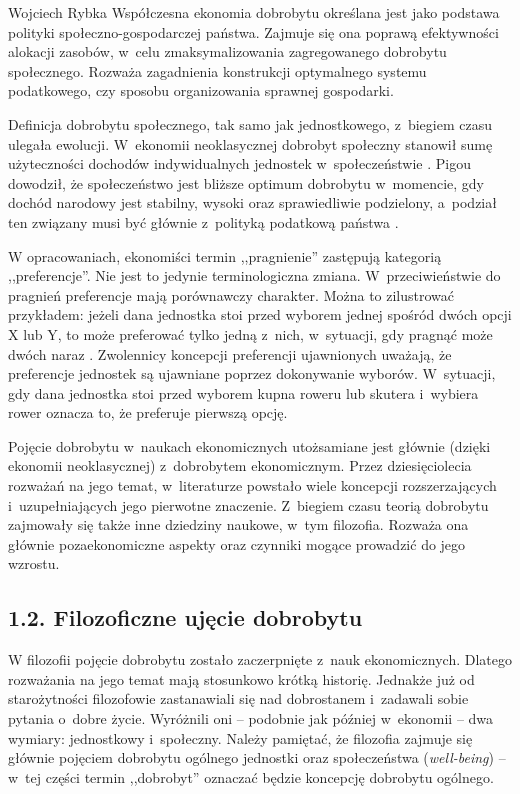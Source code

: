 \begin{artplenv}{Wojciech Rybka}
Współczesna ekonomia dobrobytu określana jest jako podstawa polityki społeczno-gospodarczej państwa. Zajmuje się ona
poprawą efektywności alokacji zasobów, w~celu zmaksymalizowania zagregowanego dobrobytu społecznego. Rozważa
zagadnienia konstrukcji optymalnego systemu podatkowego, czy sposobu organizowania sprawnej gospodarki.

Definicja dobrobytu społecznego, tak samo jak jednostkowego, z~biegiem czasu ulegała ewolucji. W~ekonomii neoklasycznej
dobrobyt społeczny stanowił sumę użyteczności dochodów indywidualnych jednostek w~społeczeństwie
\parencite{zaremba_dobrobyt_2016}.
Pigou dowodził, że społeczeństwo jest bliższe optimum
dobrobytu w~momencie, gdy dochód narodowy jest stabilny, wysoki oraz sprawiedliwie podzielony, a~podział ten związany musi być
głównie z~polityką podatkową państwa
\parencite{zaremba_dobrobyt_2016}.

W opracowaniach, ekonomiści termin ,,pragnienie'' zastępują kategorią ,,preferencje''. Nie jest to jedynie terminologiczna
zmiana. W~przeciwieństwie do pragnień preferencje mają porównawczy charakter. Można to zilustrować przykładem: jeżeli
dana jednostka stoi przed wyborem jednej spośród dwóch opcji X lub Y, to może preferować tylko jedną z~nich,
w~sytuacji, gdy pragnąć może dwóch naraz
\parencite{kwarcinski_koncepcje_2016}.
Zwolennicy koncepcji
preferencji ujawnionych uważają,
że preferencje jednostek są ujawniane poprzez dokonywanie wyborów. W~sytuacji, gdy dana jednostka
stoi przed wyborem kupna roweru lub skutera i~wybiera rower oznacza to, że preferuje pierwszą opcję. 

Pojęcie dobrobytu w~naukach ekonomicznych utożsamiane jest głównie (dzięki ekonomii neoklasycznej) z~dobrobytem
ekonomicznym. Przez dziesięciolecia rozważań na jego temat, w~literaturze powstało wiele koncepcji
rozszerzających i~uzupełniających jego pierwotne znaczenie. Z~biegiem czasu teorią dobrobytu
zajmowały się także inne dziedziny naukowe, w~tym filozofia. Rozważa ona głównie pozaekonomiczne
aspekty oraz czynniki mogące prowadzić do jego wzrostu. 

\subsection{1.2. Filozoficzne ujęcie dobrobytu}
W filozofii pojęcie dobrobytu zostało zaczerpnięte z~nauk ekonomicznych. Dlatego rozważania na jego temat mają
stosunkowo krótką historię. Jednakże już od starożytności filozofowie zastanawiali się nad dobrostanem i~zadawali sobie
pytania o~dobre życie. Wyróżnili oni -- podobnie jak później w~ekonomii -- dwa wymiary: jednostkowy i~społeczny. Należy
pamiętać, że filozofia zajmuje się głównie pojęciem dobrobytu ogólnego jednostki oraz społeczeństwa
(\textit{well-being}) -- w~tej części termin ,,dobrobyt'' oznaczać będzie koncepcję dobrobytu ogólnego. 


\end{artplenv}
